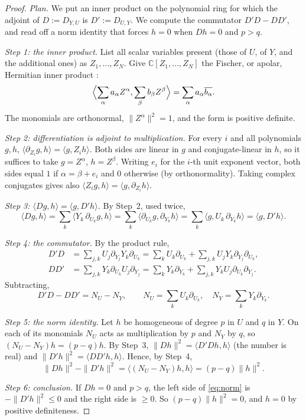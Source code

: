 \documentclass[11pt]{article}
\theoremstyle{definition}
\theoremstyle{remark}
\newcommand{\C}{\mathbb C}
\newcommand{\D}[2]{D_{#1,#2}}
\begin{document}
\begin{proof}
\emph{Plan.} We put an inner product on the polynomial ring for which the
adjoint of $D:=\D YU$ is $D':=\D UY$. We compute the commutator $D'D-DD'$,
and read off a norm identity that forces $h=0$ when $Dh=0$ and $p>q$.

\emph{Step 1: the inner product.}
List all scalar variables present (those of $U$, of $Y$, and the additional
ones) as $Z_1,\ldots,Z_N$. Give $\C[Z_1,\ldots,Z_N]$ the Fischer, or apolar,
Hermitian inner product
\cite[Section~2, equation~(8) and Proposition~3]{AldazRender}:
\[
 \Bigl\langle\sum_\alpha a_\alpha Z^\alpha,\sum_\beta b_\beta Z^\beta\Bigr\rangle
 =\sum_\alpha a_\alpha\overline{b_\alpha}.
 
\]
The monomials are orthonormal, $\|Z^\alpha\|^2=1$, and the form
is positive definite.

\emph{Step 2: differentiation is adjoint to multiplication.}
For every $i$ and all polynomials $g,h$,
$\langle\partial_{Z_i}g,h\rangle=\langle g,Z_ih\rangle$. Both sides are
linear in $g$ and conjugate-linear in $h$, so it suffices to take
$g=Z^\alpha$, $h=Z^\beta$. Writing $e_i$ for the $i$-th unit exponent
vector, both sides equal $1$ if $\alpha=\beta+e_i$ and $0$ otherwise
(by orthonormality). Taking complex conjugates
gives also $\langle Z_ig,h\rangle=\langle g,\partial_{Z_i}h\rangle$.

\emph{Step 3: $\langle Dg,h\rangle=\langle g,D'h\rangle$.}
By Step~2, used twice,
\[
 \langle Dg,h\rangle=\sum_k\langle Y_k\,\partial_{U_k}g,h\rangle
 =\sum_k\langle\partial_{U_k}g,\partial_{Y_k}h\rangle
 =\sum_k\langle g,U_k\,\partial_{Y_k}h\rangle=\langle g,D'h\rangle .
\]

\emph{Step 4: the commutator.}
By the product rule,
\begin{align*}
 D'D&=\sum_{j,k}U_j\partial_{Y_j}Y_k\partial_{U_k}
 =\sum_kU_k\partial_{U_k}+\sum_{j,k}U_jY_k\partial_{Y_j}\partial_{U_k},\\
 DD'&=\sum_{j,k}Y_k\partial_{U_k}U_j\partial_{Y_j}
 =\sum_kY_k\partial_{Y_k}+\sum_{j,k}Y_kU_j\partial_{U_k}\partial_{Y_j}.
\end{align*}
Subtracting,
\[
 D'D-DD'=N_U-N_Y,
 \qquad
 N_U=\sum_k U_k\partial_{U_k},\quad
 N_Y=\sum_k Y_k\partial_{Y_k}.
\]

\emph{Step 5: the norm identity.}
Let $h$ be homogeneous of degree $p$ in $U$ and $q$ in $Y$. On each of its
monomials $N_U$ acts as multiplication by $p$ and $N_Y$ by $q$, so
$(N_U-N_Y)h=(p-q)h$. By Step~3,
$\|Dh\|^2=\langle D'Dh,h\rangle$ (the number is real) and
$\|D'h\|^2=\langle DD'h,h\rangle$. Hence, by Step~4,
\begin{equation}\label{eq:norm}
 \|Dh\|^2-\|D'h\|^2=\langle(N_U-N_Y)h,h\rangle=(p-q)\|h\|^2.
\end{equation}

\emph{Step 6: conclusion.}
If $Dh=0$ and $p>q$, the left side of \eqref{eq:norm} is $-\|D'h\|^2\le0$
and the right side is $\ge0$. So $(p-q)\|h\|^2=0$, and $h=0$ by positive
definiteness.
\end{proof}
\end{document}
